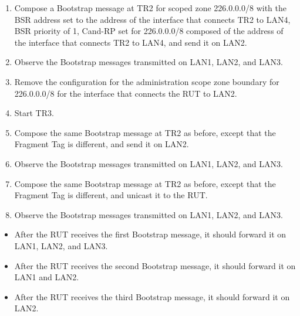 \documentclass[11pt]{report}
\begin{document}
\begin{enumerate}
  \item Compose a Bootstrap message at TR2 for scoped zone 226.0.0.0/8 with
  the BSR address set to the address of the interface that connects TR2 to
  LAN4, BSR priority of 1, Cand-RP set for 226.0.0.0/8 composed of the
  address of the interface that connects TR2 to LAN4, and send it on LAN2.

  \item Observe the Bootstrap messages transmitted on LAN1, LAN2, and LAN3.

  \item Remove the configuration for the administration scope zone boundary
  for 226.0.0.0/8 for the interface that connects the RUT to LAN2.

  \item Start TR3.

  \item Compose the same Bootstrap message at TR2 as before, except that the
  Fragment Tag is different, and send it on LAN2.

  \item Observe the Bootstrap messages transmitted on LAN1, LAN2, and LAN3.

  \item Compose the same Bootstrap message at TR2 as before, except that the
  Fragment Tag is different, and unicast it to the RUT.

  \item Observe the Bootstrap messages transmitted on LAN1, LAN2, and LAN3.

\end{enumerate}



\begin{itemize}

  \item After the RUT receives the first Bootstrap message, it should forward
  it on LAN1, LAN2, and LAN3.

  \item After the RUT receives the second Bootstrap message, it should forward
  it on LAN1 and LAN2.

  \item After the RUT receives the third Bootstrap message, it should forward
  it on LAN2.

\end{itemize}

\end{document}

